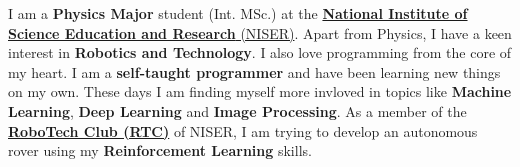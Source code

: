 	\begin{justify}
		\hspace{5mm}I am a \textbf{Physics Major} student (Int. MSc.) at the \href{https://www.niser.ac.in/}{\textbf{National Institute of Science Education and Research} (NISER)}.
		Apart from Physics, I have a keen interest in \textbf{Robotics and Technology}.
		I also love programming from the core of my heart.
		I am a \textbf{self-taught programmer} and have been learning new things on my own.
		These days I am finding myself more invloved in topics like \textbf{Machine Learning}, \textbf{Deep Learning} and \textbf{Image Processing}.
		As a member of the \href{https://www.niser.ac.in/~smishra/club/rtc/}{\textbf{RoboTech Club (RTC)}} of NISER, I am trying to develop an autonomous rover using my \textbf{Reinforcement Learning} skills.
	\end{justify}

